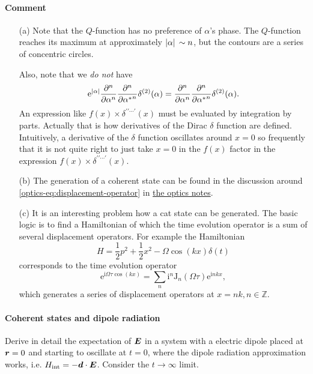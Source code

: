 \documentclass[hyperref, a4paper]{article}
\newcommand{\opticsdoc}{\href{../optics/optics}{the optics notes}}
\newcommand*{\ii}{\mathrm{i}}
\newcommand*{\ee}{\mathrm{e}}
\begin{document}
\paragraph{Comment} \begin{itemize}
    \item[(a)] Note that the $Q$-function has no preference of $\alpha$'s phase. The $Q$-function reaches its maximum at approximately $\abs*{\alpha} \sim n$, but the contours are a series of concentric circles.
    
    Also, note that we \emph{do not} have 
    \[
        \ee^{\abs*{\alpha}} \pdv[n]{\alpha} \pdv[n]{{\alpha^*}} \delta^{(2)}(\alpha) = \pdv[n]{\alpha} \pdv[n]{{\alpha^*}} \delta^{(2)}(\alpha) .
    \]
    An expression like $f(x) \times \delta^{\prime \prime \cdots \prime}(x)$ must be evaluated by integration by parts. Actually that is how derivatives of the Dirac $\delta$ function are defined.
    Intuitively, a derivative of the $\delta$ function oscillates around $x=0$ so frequently that it is not quite right to just take $x=0$ in the $f(x)$ factor in the expression $f(x) \times \delta^{\prime \prime \cdots \prime}(x)$.
    \item[(b)] The generation of a coherent state can be found in the discussion around \eqref{optics-eq:displacement-operator} in \opticsdoc.
    \item[(c)] It is an interesting problem how a cat state can be generated.  
    The basic logic is to find a Hamiltonian of which the time evolution operator is a sum of several displacement operators.
    For example the Hamiltonian
    \begin{equation}
        H = \frac{1}{2} p^2 + \frac{1}{2} x^2 - \Omega \cos(kx) \delta(t)
    \end{equation} 
    corresponds to the time evolution operator 
    \[
        \ee^{\ii \Omega \tau \cos(kx)} = \sum_n \ii^n \mathrm{J}_n(\Omega \tau) \ee^{\ii n k x},
    \]
    which generates a series of displacement operators at $x = nk, n \in \mathbb{Z}$.
\end{itemize}

\paragraph{}

\paragraph{Coherent states and dipole radiation} Derive in detail the expectation of $\vb*{E}$ in a system with a electric dipole placed at $\vb*{r}=0$ and starting to oscillate at $t=0$, where the dipole radiation approximation works, i.e. $H_\text{int} = - \vb*{d} \cdot \vb*{E}$. Consider the $t \to \infty$ limit.
\end{document}
